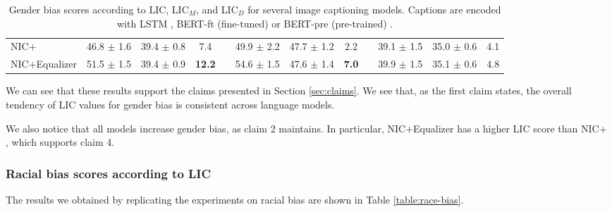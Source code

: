 \begin{table}[H]
\begin{tabular}{lccccccccccc}
NIC+ \cite{Burns2018}           & 46.8 $\pm$ 1.6 & 39.4 $\pm$ 0.8 & 7.4 & & 49.9 $\pm$ 2.2 & 47.7 $\pm$ 1.2 & 2.2 & & 39.1 $\pm$ 1.5 & 35.0 $\pm$ 0.6 & 4.1 \\
NIC+Equalizer \cite{Burns2018}  & 51.5 $\pm$ 1.5 & 39.4 $\pm$ 0.9 & \textbf{\color{red}12.2} & & 54.6 $\pm$ 1.5 & 47.6 $\pm$ 1.4 & \textbf{\color{red}7.0} & & 39.9 $\pm$ 1.5 & 35.1 $\pm$ 0.6 & 4.8 \\ \hline
\end{tabular}
\caption{Gender bias scores according to LIC, LIC$_M$, and LIC$_D$ for several image captioning models. Captions are encoded with LSTM \cite{LSTM}, BERT-ft (fine-tuned) or BERT-pre (pre-trained) \cite{BERT}.}
\label{table:gender-bias}
\endgroup
\end{table}

We can see that these results support the claims presented in Section \ref{sec:claims}. We see that, as the first claim states, the overall tendency of LIC values for gender bias is consistent across language models.

We also notice that all models increase gender bias, as claim 2 maintains. In particular, NIC+Equalizer \cite{Burns2018} has a higher LIC score than NIC+ \cite{Burns2018}, which supports claim 4.

\subsubsection{Racial bias scores according to LIC}
The results we obtained by replicating the experiments on racial bias are shown in Table \ref{table:race-bias}.

